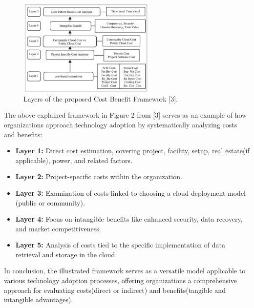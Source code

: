 \documentclass{article}
\begin{document}
\begin{figure}[h]
    \centering
    \includegraphics[width=0.6\textwidth]{Figure2.png}
    \caption{Layers of the proposed Cost Benefit Framework [3].}
    \label{fig:conceptual-model}
\end{figure}

\noindent The above explained framework in Figure 2 from [3] serves as an example of how organizations approach technology adoption by systematically analyzing costs and benefits:
\begin{itemize}
    \item \textbf{Layer 1:} Direct cost estimation, covering project, facility, setup, real estate(if applicable), power, and related factors.
    \item \textbf{Layer 2:} Project-specific costs within the organization.
    \item \textbf{Layer 3:} Examination of costs linked to choosing a cloud deployment model (public or community).
    \item \textbf{Layer 4:} Focus on intangible benefits like enhanced security, data recovery, and market competitiveness.
    \item \textbf{Layer 5:} Analysis of costs tied to the specific implementation of data retrieval and storage in the cloud.
\end{itemize}

\noindent In conclusion, the illustrated framework serves as a versatile model applicable to various technology adoption processes, offering organizations a comprehensive approach for evaluating costs(direct or indirect) and benefits(tangible and intangible advantages).
\end{document}
